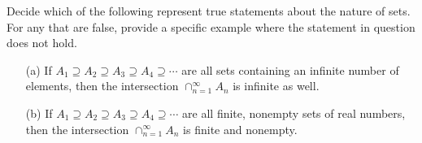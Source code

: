 \documentclass{article}
\begin{document}
\begin{Prob}[Ex. 1.2.3 (a-b)]
Decide which of the following  represent true statements about the nature of sets. For any that are false, provide a specific example where the statement in question does not hold.
\begin{enumerate}
\item[(a)] If $A_1\supseteq A_2\supseteq A_3\supseteq A_4\supseteq \cdots$ are all sets containing an infinite number of elements, then the intersection $\cap_{n=1}^\infty A_n$ is infinite as well.
\item[(b)] If $A_1\supseteq A_2\supseteq A_3\supseteq A_4\supseteq \cdots$ are all finite, nonempty sets of real numbers, then the intersection $\cap_{n=1}^\infty A_n$ is finite and nonempty.
\end{enumerate}
\end{Prob}
\end{document}
